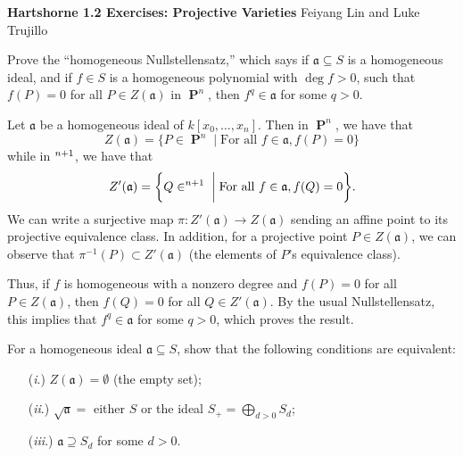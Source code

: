 \documentclass{hw_pset} %
\let\aa\relax
\DeclareMathOperator{\aa}{\mathbf{A}} %
\DeclareMathOperator{\pp}{\mathbf{P}} %
\newcommand{\idl}[1]{\mathfrak{#1}} %
\newcommand{\header}[2]{
    {\noindent
    {\Large \bf Hartshorne #1 Exercises: #2}
    \hfill 
    {\large Feiyang Lin and Luke Trujillo}
    \vspace{0.5cm}}
}
\begin{document}
\header{1.2}{Projective Varieties}

\begin{exercise}[Exercise 2.1]
    Prove the ``homogeneous Nullstellensatz,'' which says if $\mathfrak{a}
    \subseteq S$ is a homogeneous ideal, and if $f \in S$ is a homogeneous
    polynomial with $\deg f > 0$, such that $f(P) = 0$ for all $P \in
    Z(\mathfrak{a})$ in $\pp^n$, then $f^q \in \mathfrak{a}$ for some $q >
    0$.
\end{exercise}

\begin{solution}
    Let $\idl{a}$ be a homogeneous ideal of $k[x_0, \dots, x_n]$. 
    Then in $\pp^n$, we have that  
    \[
        Z(\idl{a}) = \bigg\{ P \in \pp^n \;\bigg|\; \text{For all } f \in \idl{a}, f(P) = 0  \bigg\}
    \]
    while in $\aa^{n+1}$, we have that 
    \[
        Z'(\idl{a}) = \bigg\{ Q \in \aa^{n+1} \;\bigg|\; \text{For all } f \in \idl{a}, f(Q) = 0  \bigg\}.
    \]
    We can write a surjective map $\pi: Z'(\idl{a}) \to Z(\idl{a})$ sending an affine point to its projective 
    equivalence class.
    In addition, for a projective point $P \in Z(\idl{a})$, we can observe that 
    $\pi^{-1}(P) \subset Z'(\idl{a})$ (the elements of $P$'s equivalence class). 
    
    Thus, if $f$ is homogeneous with a nonzero degree and $f(P) = 0$ for all $P \in Z(\idl{a})$, 
    then $f(Q) = 0$ for all $Q \in Z'(\idl{a})$. By the usual Nullstellensatz, 
    this implies that $f^q \in \idl{a}$ for some $q > 0$, which proves the result. 
\end{solution}

\begin{exercise}[Exercise 2.2]
    For a homogeneous ideal $\mathfrak{a} \subseteq S$, show that the following
    conditions are equivalent:
    \begin{itemize}
        \item[(\emph{i}.)] $Z(\mathfrak{a}) = \emptyset$ (the empty set);
        \item[(\emph{ii}.)] $\sqrt{\mathfrak{a}} =$ either $S$ or the ideal $S_+ =
        \bigoplus_{d > 0}S_d$;
        \item[(\emph{iii}.)] $\mathfrak{a} \supseteq S_d$ for some $d > 0$. 
    \end{itemize}
\end{exercise}
\end{document}
